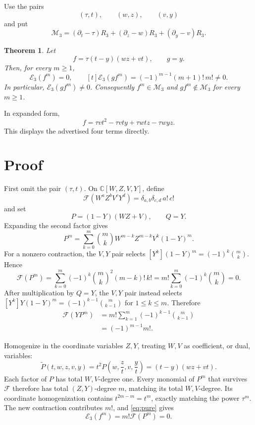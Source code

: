 \documentclass[11pt]{article}
\newtheorem{theorem}{Theorem}
\newcommand{\C}{\mathbb C}
\newcommand{\Eop}{\mathcal E}
\newcommand{\M}{\mathcal M}
\begin{document}
Use the pairs
\[
 (\tau,t),\qquad(w,z),\qquad(v,y)
\]
and put
\[
 \M_3=(\partial_t-\tau)R_3+
       (\partial_z-w)R_3+
       (\partial_y-v)R_3.
\]

\begin{theorem}\label{thm:main}
Let
\[
 \boxed{\quad
 f=\tau(t-y)(wz+vt),\qquad g=y.
 \quad}
\]
Then, for every \(m\geq1\),
\[
 \Eop_3(f^m)=0,\qquad
 [t]\Eop_3(gf^m)=(-1)^{m-1}(m+1)!\,m!\neq0.
\]
In particular, \(\Eop_3(gf^m)\neq0\).  Consequently
\(f^m\in\M_3\) and \(gf^m\notin\M_3\) for every \(m\geq1\).
\end{theorem}

In expanded form,
\[
\boxed{\;
 f=\tau vt^2-\tau vty+\tau wtz-\tau wyz.
\;}
\]
This displays the advertised four terms directly.

\section{Proof}

First omit the pair \((\tau,t)\).  On
\(\C[W,Z,V,Y]\), define
\[
 \mathcal F(W^aZ^bV^cY^d)
 =\delta_{a,b}\delta_{c,d}\,a!\,c!
\]
and set
\[
 P=(1-Y)(WZ+V),\qquad Q=Y.
\]
Expanding the second factor gives
\[
 P^m=\sum_{k=0}^m\binom mk
 W^{m-k}Z^{m-k}V^k(1-Y)^m.
\]
For a nonzero contraction, the \(V,Y\) pair selects
\([Y^k](1-Y)^m=(-1)^k\binom mk\).  Hence
\begin{equation}\label{eq:pure}
 \mathcal F(P^m)
 =\sum_{k=0}^m(-1)^k\binom mk^2(m-k)!\,k!
 =m!\sum_{k=0}^m(-1)^k\binom mk=0.
\end{equation}
After multiplication by \(Q=Y\), the \(V,Y\) pair instead selects
\([Y^k]Y(1-Y)^m=(-1)^{k-1}\binom m{k-1}\) for \(1\leq k\leq m\).
Therefore
\begin{equation}\label{eq:mixed}
 \begin{aligned}
 \mathcal F(YP^m)
 &=m!\sum_{k=1}^m(-1)^{k-1}\binom m{k-1}\\
 &=(-1)^{m-1}m!.
 \end{aligned}
\end{equation}

Homogenize in the coordinate variables \(Z,Y\), treating \(W,V\) as
coefficient, or dual, variables:
\[
 \widetilde P(t,w,z,v,y)
 =t^2P\left(w,\frac zt,v,\frac yt\right)
 =(t-y)(wz+vt).
\]
Each factor of \(P\) has total \(W,V\)-degree one.  Every monomial of
\(P^m\) that survives \(\mathcal F\) therefore has total
\((Z,Y)\)-degree \(m\), matching its total \(W,V\)-degree.  Its
coordinate homogenization contains
\(t^{2m-m}=t^m\), exactly matching the power \(\tau^m\).
The new contraction contributes \(m!\), and
\eqref{eq:pure} gives
\[
 \Eop_3(f^m)=m!\mathcal F(P^m)=0.
\]
\end{document}
